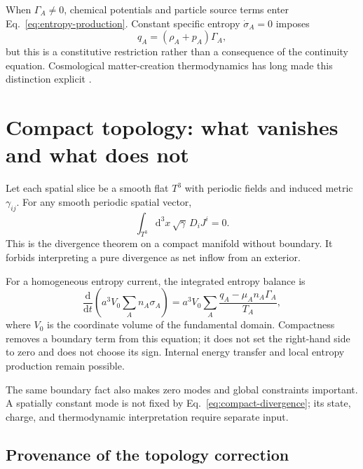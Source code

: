 \documentclass[aps,prd,reprint,superscriptaddress,nofootinbib,floatfix]{revtex4-2}
\newcommand{\Tthree}{T^{3}}
\newcommand{\dd}{\mathrm{d}}
\begin{document}
When \(\Gamma_A\neq0\), chemical potentials and particle source terms enter
Eq.~\eqref{eq:entropy-production}.  Constant specific entropy
\(\dot\sigma_A=0\) imposes
\begin{equation}
 q_A=(\rho_A+p_A)\Gamma_A,
 \label{eq:adiabatic-creation}
\end{equation}
but this is a constitutive restriction rather than a consequence of the
continuity equation.  Cosmological matter-creation thermodynamics has long
made this distinction explicit \cite{prigogine1988,calvao_lima_waga}.

\section{Compact topology: what vanishes and what does not}
\label{sec:topology}

Let each spatial slice be a smooth flat \(\Tthree\) with periodic fields and
induced metric \(\gamma_{ij}\).  For any smooth periodic spatial vector,
\begin{equation}
 \int_{\Tthree}\dd^3x\,\sqrt{\gamma}\,D_iJ^i=0.
 \label{eq:compact-divergence}
\end{equation}
This is the divergence theorem on a compact manifold without boundary.  It
forbids interpreting a pure divergence as net inflow from an exterior.

For a homogeneous entropy current, the integrated entropy balance is
\begin{equation}
 \frac{\dd}{\dd t}
 \left(a^3V_0\sum_A n_A\sigma_A\right)
 =a^3V_0\sum_A
 \frac{q_A-\mu_An_A\Gamma_A}{T_A},
 \label{eq:integrated-entropy}
\end{equation}
where \(V_0\) is the coordinate volume of the fundamental domain.  Compactness
removes a boundary term from this equation; it does not set the right-hand
side to zero and does not choose its sign.  Internal energy transfer and local
entropy production remain possible.

The same boundary fact also makes zero modes and global constraints important.
A spatially constant mode is not fixed by Eq.~\eqref{eq:compact-divergence};
its state, charge, and thermodynamic interpretation require separate input.

\subsection{Provenance of the topology correction}
\end{document}
